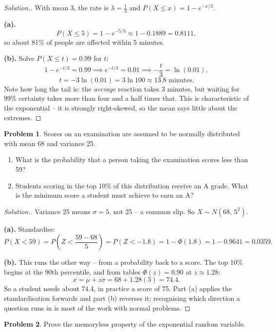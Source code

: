 \documentclass[12pt,a4paper]{report}
\theoremstyle{definition}
\theoremstyle{plain}
\theoremstyle{definition}
\newtheorem{problemx}{Problem}[section]
\newenvironment{problem}{\begin{problemx}}{\end{problemx}}
\newenvironment{solution}
  {\renewcommand{\qedsymbol}{}\begin{proof}[\textit{Solution}.]}
  {\end{proof}}
\begin{document}
\begin{solution}
With mean 3, the rate is $\lambda = \tfrac13$ and $P(X\leq x) = 1-e^{-x/3}$.

\textbf{(a).} \[P(X\leq 5) = 1-e^{-5/3} \approx 1-0.1889 = 0.8111,\]
so about 81\% of people are affected within 5 minutes.

\textbf{(b).} Solve $P(X\leq t) = 0.99$ for $t$:
\[1-e^{-t/3} = 0.99 \implies e^{-t/3} = 0.01 \implies -\frac{t}{3} = \ln(0.01),\]
\[t = -3\ln(0.01) = 3\ln 100 \approx 13.8 \text{ minutes}.\]
Note how long the tail is: the \emph{average} reaction takes 3 minutes, but waiting for
99\% certainty takes more than four and a half times that. This is characteristic of the
exponential -- it is strongly right-skewed, so the mean says little about the extremes.
\end{solution}

\begin{problem}
Scores on an examination are assumed to be normally distributed with mean 68 and variance
25.
\begin{enumerate}
\item[(a).] What is the probability that a person taking the examination scores less
than 59?
\item[(b).] Students scoring in the top 10\% of this distribution receive an A grade. What
is the minimum score a student must achieve to earn an A?
\end{enumerate}
\end{problem}

\begin{solution}
Variance 25 means $\sigma = 5$, not 25 -- a common slip. So $X\sim N(68,\,5^{2})$.

\textbf{(a).} Standardise:
\[P(X<59) = P\left(Z<\frac{59-68}{5}\right) = P(Z<-1.8) = 1-\Phi(1.8) = 1-0.9641
 = 0.0359.\]

\textbf{(b).} This runs the other way -- from a probability back to a score. The top 10\%
begins at the 90th percentile, and from tables $\Phi(z) = 0.90$ at $z \approx 1.28$:
\[x = \mu+z\sigma = 68+1.28(5) = 74.4.\]
So a student needs about 74.4, in practice a score of 75. Part (a) applies the
standardisation forwards and part (b) reverses it; recognising which direction a question
runs in is most of the work with normal problems.
\end{solution}

\begin{problem}
Prove the memoryless property of the exponential random variable.
\end{problem}
\end{document}
